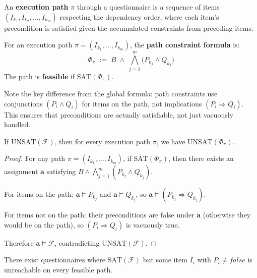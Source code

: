 \begin{definition}
\label{def:execution-path}
An \textbf{execution path} $\pi$ through a questionnaire is a sequence of items $(I_{k_1}, I_{k_2}, \ldots, I_{k_m})$ respecting the dependency order, where each item's precondition is satisfied given the accumulated constraints from preceding items.
\end{definition}

\begin{definition}
\label{def:path-formula}
For an execution path $\pi = (I_{k_1}, \ldots, I_{k_m})$, the \textbf{path constraint formula} is:
\[
  \Phi_\pi \;:=\; B \;\wedge\; \bigwedge_{j=1}^{m} \bigl(P_{k_j} \wedge Q_{k_j}\bigr)
\]
The path is \textbf{feasible} if $\mathrm{SAT}(\Phi_\pi)$.
\end{definition}

Note the key difference from the global formula: path constraints use conjunctions $(P_i \wedge Q_i)$ for items on the path, not implications $(P_i \Rightarrow Q_i)$. This ensures that preconditions are actually satisfiable, not just vacuously handled.

\begin{theorem}
\label{thm:global-necessary}
If $\mathrm{UNSAT}(\mathcal{F})$, then for every execution path $\pi$, we have $\mathrm{UNSAT}(\Phi_\pi)$.
\end{theorem}

\begin{proof}
For any path $\pi = (I_{k_1}, \ldots, I_{k_m})$, if $\mathrm{SAT}(\Phi_\pi)$, then there exists an assignment $\mathbf{a}$ satisfying $B \wedge \bigwedge_{j=1}^m (P_{k_j} \wedge Q_{k_j})$.

For items on the path: $\mathbf{a} \models P_{k_j}$ and $\mathbf{a} \models Q_{k_j}$, so $\mathbf{a} \models (P_{k_j} \Rightarrow Q_{k_j})$.

For items not on the path: their preconditions are false under $\mathbf{a}$ (otherwise they would be on the path), so $(P_i \Rightarrow Q_i)$ is vacuously true.

Therefore $\mathbf{a} \models \mathcal{F}$, contradicting $\mathrm{UNSAT}(\mathcal{F})$.
\end{proof}

\begin{theorem}
\label{thm:global-not-sufficient}
There exist questionnaires where $\mathrm{SAT}(\mathcal{F})$ but some item $I_i$ with $P_i \neq \mathit{false}$ is unreachable on every feasible path.
\end{theorem}

